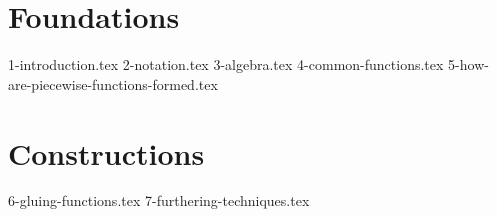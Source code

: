 \documentclass[10pt,a4paper]{article}
\begin{document}
\maketitle
\tableofcontents
\newpage

\part{Foundations}
{1-introduction.tex}
{2-notation.tex}
{3-algebra.tex}
{4-common-functions.tex}
{5-how-are-piecewise-functions-formed.tex}

\part{Constructions}
{6-gluing-functions.tex}
{7-furthering-techniques.tex}
\end{document}

